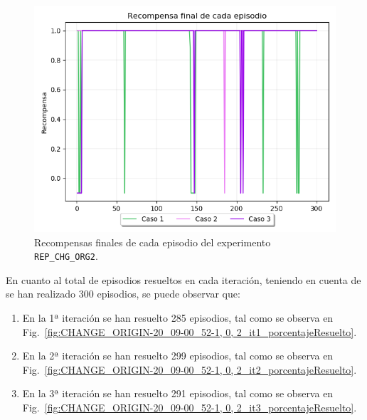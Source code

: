 \begin{figure}
    \centering
    \includegraphics[scale=0.4]{cap5_experimentacion/images/CHANGE_ORIGIN-20_09-00_52-1, 0, 2_recompensa.png}
    \caption{Recompensas finales de cada episodio del experimento \texttt{REP\_CHG\_ORG2}.}
    \label{fig:CHANGE_ORIGIN-20_09-00_52-1, 0, 2_recompensa}
\end{figure}

En cuanto al total de episodios resueltos en cada iteración, teniendo en cuenta de se han realizado 300 episodios, se puede observar que: 
\begin{enumerate}
    \item En la 1ª iteración se han resuelto 285 episodios, tal como se observa en Fig.~\ref{fig:CHANGE_ORIGIN-20_09-00_52-1, 0, 2_it1_porcentajeResuelto}.
    \item En la 2ª iteración se han resuelto 299 episodios, tal como se observa en Fig.~\ref{fig:CHANGE_ORIGIN-20_09-00_52-1, 0, 2_it2_porcentajeResuelto}.
    \item En la 3ª iteración se han resuelto 291 episodios, tal como se observa en Fig.~\ref{fig:CHANGE_ORIGIN-20_09-00_52-1, 0, 2_it3_porcentajeResuelto}.
\end{enumerate}

